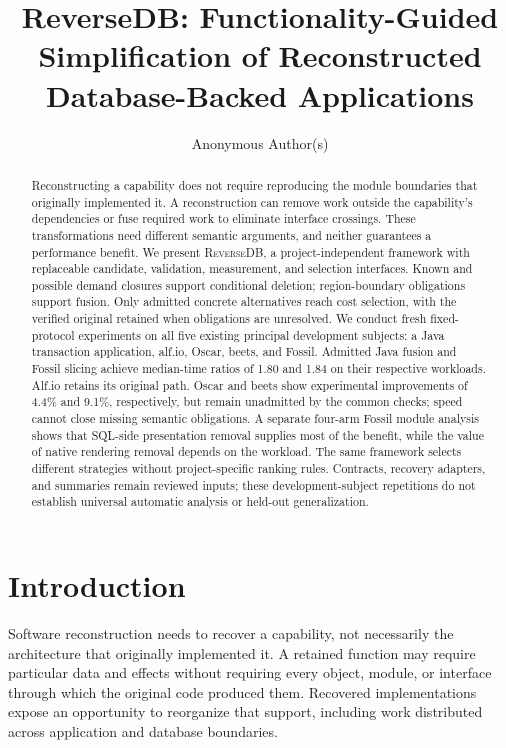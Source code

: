 \documentclass[acmsmall,screen,review,anonymous]{acmart}
\title[ReverseDB: Functionality-Guided Reconstruction]{ReverseDB: Functionality-Guided Simplification of Reconstructed Database-Backed Applications}
\author{Anonymous Author(s)}
\newcommand{\sys}{\textsc{ReverseDB}}
\begin{document}
\begin{abstract}
Reconstructing a capability does not require reproducing the module boundaries
that originally implemented it. A reconstruction can remove work outside the
capability's dependencies or fuse required work to eliminate interface crossings.
These transformations need different semantic arguments, and neither guarantees
a performance benefit. We present \sys{}, a project-independent framework
with replaceable candidate, validation, measurement, and selection interfaces.
Known and possible demand closures support conditional deletion; region-boundary
obligations support fusion. Only admitted concrete alternatives reach cost
selection, with the verified original retained when obligations are unresolved.
We conduct fresh fixed-protocol experiments on all five existing principal
development subjects: a Java transaction application, alf.io, Oscar, beets, and
Fossil. Admitted Java fusion and Fossil slicing achieve median-time ratios of
1.80 and 1.84 on their respective workloads. Alf.io retains its original path.
Oscar and beets show experimental improvements of 4.4\% and 9.1\%, respectively,
but remain unadmitted by the common checks; speed cannot close missing semantic
obligations. A separate four-arm Fossil module analysis shows that SQL-side
presentation removal supplies most of the benefit, while the value of native
rendering removal depends on the workload. The same framework selects different
strategies without project-specific ranking rules. Contracts, recovery adapters,
and summaries remain reviewed inputs; these development-subject repetitions
do not establish universal automatic analysis or held-out generalization.
\end{abstract}

\maketitle

\section{Introduction}
\label{sec:introduction}
Software reconstruction needs to recover a capability, not necessarily the
architecture that originally implemented it. A retained function may require
particular data and effects without requiring every object, module, or interface
through which the original code produced them. Recovered implementations expose
an opportunity to reorganize that support, including work distributed across
application and database boundaries.
\end{document}
